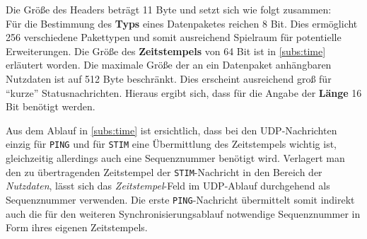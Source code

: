 Die Größe des Headers beträgt 11 Byte und setzt sich wie folgt zusammen:\\
Für die Bestimmung des \textbf{Typs} eines Datenpaketes reichen 8 Bit. Dies
ermöglicht 256 verschiedene Pakettypen und somit ausreichend Spielraum für
potentielle Erweiterungen. Die Größe des \textbf{Zeitstempels} von 64 Bit ist in
\autoref{subs:time} erläutert worden. Die maximale Größe der an ein
Datenpaket anhängbaren Nutzdaten ist auf 512 Byte beschränkt. Dies erscheint
ausreichend groß für "`kurze"' Statusnachrichten. Hieraus ergibt sich, dass für
die Angabe der \textbf{Länge} 16 Bit benötigt werden.


Aus dem Ablauf in \autoref{subs:time} ist ersichtlich, dass bei den
UDP-Nachrichten einzig für \texttt{PING} und für \texttt{STIM} eine
Übermittlung des Zeitstempels wichtig ist, gleichzeitig allerdings auch eine
Sequenznummer benötigt wird. Verlagert man den zu übertragenden Zeitstempel der
\texttt{STIM}-Nachricht in den Bereich der \emph{Nutzdaten}, lässt sich das
\emph{Zeitstempel}-Feld im UDP-Ablauf durchgehend als Sequenznummer verwenden.
Die erste \texttt{PING}-Nachricht übermittelt somit indirekt auch die für den
weiteren Synchronisierungsablauf notwendige Sequenznummer in Form ihres eigenen
Zeitstempels.

